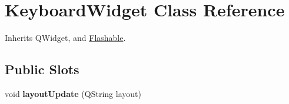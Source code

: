\hypertarget{class_keyboard_widget}{\section{Keyboard\-Widget Class Reference}
\label{class_keyboard_widget}
}


Inherits Q\-Widget, and \hyperlink{class_flashable}{Flashable}.

\subsection*{Public Slots}
\begin{DoxyCompactItemize}
\item 
\hypertarget{class_keyboard_widget_a11dbb17db310484aea61e2f7ad289f2a}{void {\bfseries layout\-Update} (Q\-String layout)}\label{class_keyboard_widget_a11dbb17db310484aea61e2f7ad289f2a}

\end{DoxyCompactItemize}

